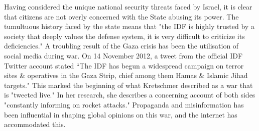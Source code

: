 Having considered the unique national security threats faced by Israel, it is clear that citizens are not overly concerned with the State abusing its power. The tumultuous history faced by the state means that "the IDF is highly trusted by a society that deeply values the defense system, it is very difficult to criticize its deficiencies." \cite{MAGEN2018287} A troubling result of the Gaza crisis has been the utilisation of social media during war. On 14 November 2012, a tweet from the official IDF Twitter account stated “The IDF has begun a widespread campaign on terror sites \& operatives in the Gaza Strip, chief among them Hamas \& Islamic Jihad targets." \cite{IDF_Twitter} This marked the beginning of what Kretschmer described as a war that is "tweeted live." In her research, she describes a concerning account of both sides "constantly informing on rocket attacks." \cite {Kretschmer_2017} Propaganda and misinformation has been influential in shaping global opinions on this war, and the internet has accommodated this.

